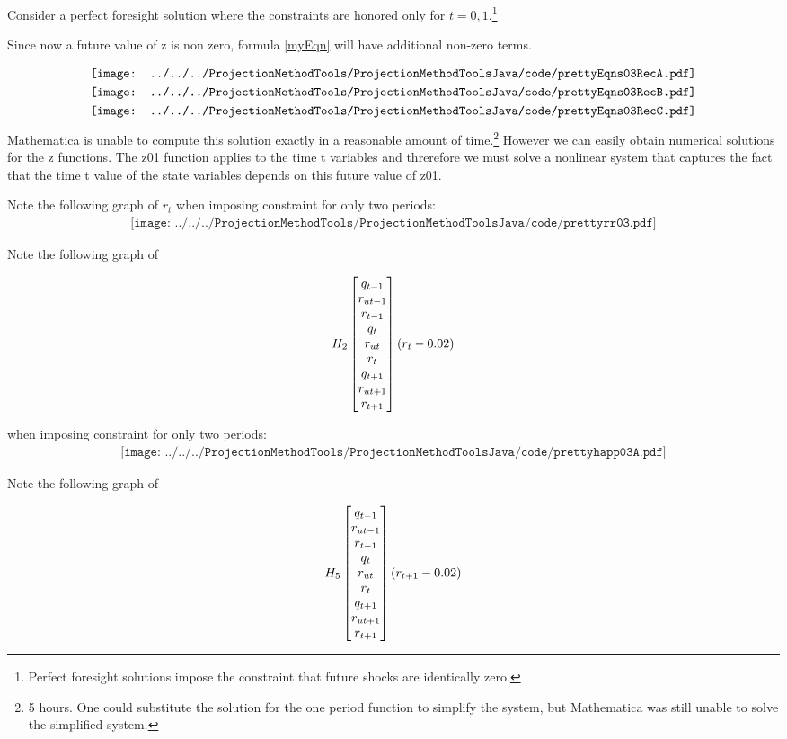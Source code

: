 
Consider a perfect foresight solution where the constraints are honored only 
for $t=0,1$.\footnote{ Perfect foresight solutions impose the constraint that future shocks are identically zero.}

Since now a future value of z is non zero, formula \ref{myEqn}  will have additional non-zero terms.


\begin{gather*}
  \vcenter{\hbox{\texttt{[image: ../../../ProjectionMethodTools/ProjectionMethodToolsJava/code/prettyEqns03RecA.pdf]}}}\\
  \vcenter{\hbox{\texttt{[image: ../../../ProjectionMethodTools/ProjectionMethodToolsJava/code/prettyEqns03RecB.pdf]}}}\\
  \vcenter{\hbox{\texttt{[image: ../../../ProjectionMethodTools/ProjectionMethodToolsJava/code/prettyEqns03RecC.pdf]}}}\\
\end{gather*}
Mathematica is unable to compute this solution exactly in a reasonable amount
of time.\footnote{ 5 hours.  One could substitute the solution for the one period function to simplify the system, but Mathematica was still unable to solve the simplified system.}  However we can easily obtain numerical solutions for the z functions.  The z01 function applies to the time t variables and 
threrefore we must solve a nonlinear system that captures the fact that
the time t value of the state variables depends on this future value of z01.


Note the following graph of $r_t$ when imposing constraint for only two periods:
\begin{gather*}
\texttt{[image: ../../../ProjectionMethodTools/ProjectionMethodToolsJava/code/prettyrr03.pdf]}
\end{gather*}





 Note the following graph of 

 \begin{gather*}
 H_{2}\begin{bmatrix} q_{t-1}\\r_{ut-1}\\r_{t-1}\\ q_{t}\\r_{ut}\\r_{t}\\ q_{t+1}\\r_{ut+1}\\r_{t+1} \end{bmatrix} ( r_t-0.02)
 \end{gather*}

  when imposing constraint for only two periods:
 \begin{gather*}
 \texttt{[image: ../../../ProjectionMethodTools/ProjectionMethodToolsJava/code/prettyhapp03A.pdf]}
 \end{gather*}


 Note the following graph of 

 \begin{gather*}
 H_{5}\begin{bmatrix} q_{t-1}\\r_{ut-1}\\r_{t-1}\\ q_{t}\\r_{ut}\\r_{t}\\ q_{t+1}\\r_{ut+1}\\r_{t+1} \end{bmatrix}( r_{t+1}-0.02)
 \end{gather*}

